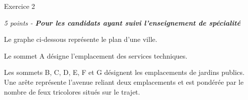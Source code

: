 
%
\begin{h2}Exercice 2\end{h2}
\par
\textit{5 points - \textbf{Pour les candidats ayant  suivi l'enseignement de spécialité}}
 
Le graphe ci-dessous représente le plan d'une ville.
\par
Le sommet A désigne l'emplacement des services techniques.
\par
Les sommets B, C, D, E, F et G désignent les emplacements de jardins publics. Une arête représente l'avenue reliant deux emplacements et est pondérée par le nombre de feux tricolores situés sur le trajet.

